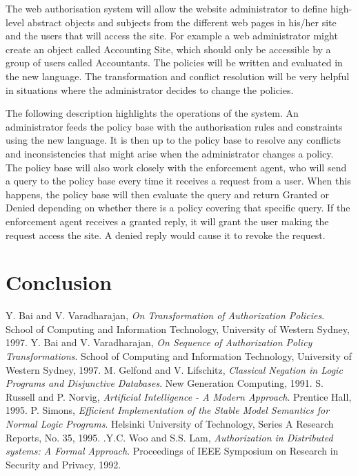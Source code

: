 \documentclass[a4paper,draft]{article}
\begin{document}
      The web authorisation system will allow the website administrator to
      define high-level abstract objects and subjects from the different web
      pages in his/her site and the users that will access the site. For
      example a web administrator might create an object called Accounting
      Site, which should only be accessible by a group of users called
      Accountants. The policies will be written and evaluated in the new
      language. The transformation and conflict resolution will be very
      helpful in situations where the administrator decides to change
      the policies.

      The following description highlights the operations of the system. 
      An administrator feeds the policy base with the authorisation rules
      and constraints using the new language. It is then up to the policy
      base to resolve any conflicts and inconsistencies that might arise
      when the administrator changes a policy. The policy base will also
      work closely with the enforcement agent, who will send a query to
      the policy base every time it receives a request from a user. When
      this happens, the policy base will then evaluate the query and return
      Granted or Denied depending on whether there is a policy covering
      that specific query. If the enforcement agent receives a granted 
      reply, it will grant the user making the request access the site.
      A denied reply would cause it to revoke the request.

    \pagebreak

  \section{Conclusion}

    \pagebreak

  \begin{thebibliography}{}
    Y. Bai and V. Varadharajan, \emph{On Transformation of Authorization Policies}. School of Computing and Information Technology, University of Western Sydney, 1997.
    Y. Bai and V. Varadharajan, \emph{On Sequence of Authorization Policy Transformations}. School of Computing and Information Technology, University of Western Sydney, 1997.
    M. Gelfond and V. Lifschitz, \emph{Classical Negation in Logic Programs and Disjunctive Databases}. New Generation Computing, 1991.
    S. Russell and P. Norvig, \emph{Artificial Intelligence - A Modern Approach}. Prentice Hall, 1995.
    P. Simons, \emph{Efficient Implementation of the Stable Model Semantics for Normal Logic Programs}. Helsinki University of Technology, Series A Research Reports, No. 35, 1995.
    .Y.C. Woo and S.S. Lam, \emph{Authorization in Distributed systems: A Formal Approach}. Proceedings of IEEE Symposium on Research in Security and Privacy, 1992.
  \end{thebibliography}
\end{document}
